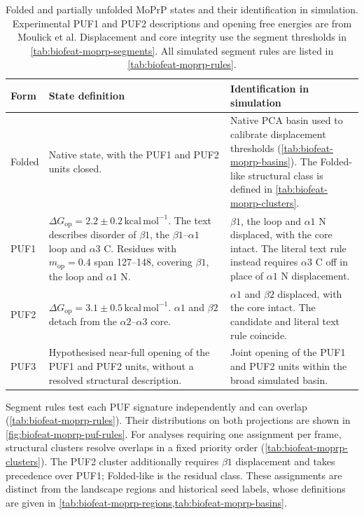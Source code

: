 \begin{table}[htbp]
    \centering
    \small
    \begin{tabularx}{\textwidth}{@{}l>{\raggedright\arraybackslash}X>{\raggedright\arraybackslash}X@{}}
    \toprule
        \textbf{Form} & \textbf{State definition} & \textbf{Identification in simulation} \\
    \midrule
        Folded & Native state, with the PUF1 and PUF2 units closed. & Native PCA basin used to calibrate displacement thresholds (\cref{tab:biofeat-moprp-basins}). The Folded-like structural class is defined in \cref{tab:biofeat-moprp-clusters}. \\
        PUF1 & $\Delta G_\mathrm{op}=2.2\pm0.2\,\mathrm{kcal\,mol^{-1}}$. The text describes disorder of $\beta1$, the $\beta1$--$\alpha1$ loop and $\alpha3$ C. Residues with $m_\mathrm{op}=0.4$ span 127--148, covering $\beta1$, the loop and $\alpha1$ N. & $\beta1$, the loop and $\alpha1$ N displaced, with the core intact. The literal text rule instead requires $\alpha3$ C off in place of $\alpha1$ N displacement. \\
        PUF2 & $\Delta G_\mathrm{op}=3.1\pm0.5\,\mathrm{kcal\,mol^{-1}}$. $\alpha1$ and $\beta2$ detach from the $\alpha2$--$\alpha3$ core. & $\alpha1$ and $\beta2$ displaced, with the core intact. The candidate and literal text rule coincide. \\
        PUF3 & Hypothesised near-full opening of the PUF1 and PUF2 units, without a resolved structural description. & Joint opening of the PUF1 and PUF2 units within the broad simulated basin. \\

    \bottomrule
    \end{tabularx}
    \caption{Folded and partially unfolded MoPrP states and their identification in simulation. Experimental PUF1 and PUF2 descriptions and opening free energies are from Moulick et al.\supercite{moulickPartiallyUnfoldedForms2015} Displacement and core integrity use the segment thresholds in \cref{tab:biofeat-moprp-segments}. All simulated segment rules are listed in \cref{tab:biofeat-moprp-rules}.}
    \label{tab:biofeat-puf-definitions}
\end{table}

Segment rules test each PUF signature independently and can overlap (\cref{tab:biofeat-moprp-rules}). Their distributions on both projections are shown in \cref{fig:biofeat-moprp-puf-rules}. For analyses requiring one assignment per frame, structural clusters resolve overlaps in a fixed priority order (\cref{tab:biofeat-moprp-clusters}). The PUF2 cluster additionally requires $\beta1$ displacement and takes precedence over PUF1; Folded-like is the residual class. These assignments are distinct from the landscape regions and historical seed labels, whose definitions are given in \cref{tab:biofeat-moprp-regions,tab:biofeat-moprp-basins}.

